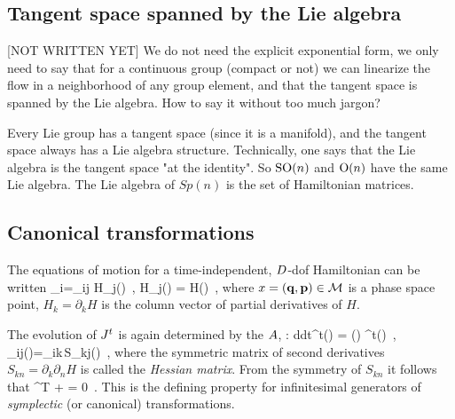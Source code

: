 \subsection{Tangent space spanned by the Lie algebra}
\label{sect:tanSpace}

[NOT WRITTEN YET]
We do not need the explicit exponential form, we
only need to say that for a continuous group (compact or not) we can
linearize the flow in a neighborhood of any group element, and that
the tangent space is spanned by the Lie algebra. How to say it without
too much jargon?

Every Lie group has a tangent space (since it is a manifold), and the
tangent space always has a Lie algebra structure. Technically, one says
that the Lie algebra is the tangent space "at the identity". So $\textrm{SO}(n)$
and $\textrm{O}(n)$ have the same Lie algebra. The Lie algebra of $Sp(n)$ is the
set of Hamiltonian matrices.

\subsection{Canonical transformations}
\label{sect:CanonTransf}

The equations of motion
for a time-independent, $D$-dof Hamiltonian
can be written
\beq
{}_i={\omega}_{ij} H_j(\pSpace)
    \,, \quad
    H_j(\pSpace) =
     H(\pSpace)
        \,,
where $x = ({\bf q},{\bf p}) \in {\cal M}$ is a phase space point,
$H_{k} = \partial_k H$
is the column vector of partial derivatives of $H$.

The
evolution of $J^t$  is again determined by
the {\stabmat} $A$, :
\beq
{d\over dt}\jMps^t(\pSpace) = \Mvar(\pSpace)
\jMps^t(\pSpace)
\,, \qquad
\Mvar_{ij}(\pSpace)={\omega}_{ik}\,S_{kj}(\pSpace)
\,,
where the symmetric matrix of second derivatives
$S_{kn} = \partial_k \partial_n H$
is called the {\em Hessian matrix}.
From
the symmetry of $S_{kn}$
it follows that
\beq
 \Mvar^T {\bf \omega} + {\bf \omega} \Mvar = 0
\,.
This is the defining property  for infinitesimal
generators of {\em symplectic} (or canonical) transformations.

